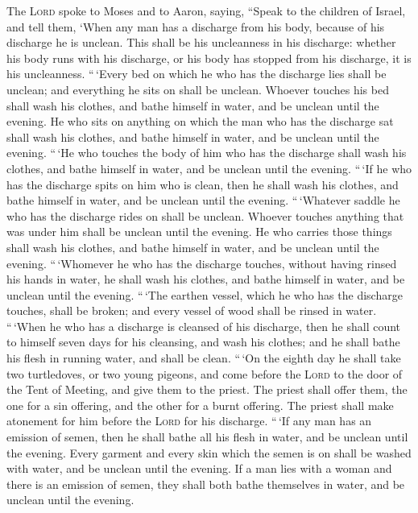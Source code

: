  The \textsc{Lord} spoke to Moses and to Aaron, saying,
 ``Speak to the children of Israel, and tell them, `When
any man has a discharge from his body, because of his discharge he is
unclean.  This shall be his uncleanness in his discharge:
whether his body runs with his discharge, or his body has stopped from
his discharge, it is his uncleanness.  ``\,`Every bed on
which he who has the discharge lies shall be unclean; and everything he
sits on shall be unclean.  Whoever touches his bed shall
wash his clothes, and bathe himself in water, and be unclean until the
evening.  He who sits on anything on which the man who has
the discharge sat shall wash his clothes, and bathe himself in water,
and be unclean until the evening.  ``\,`He who touches the
body of him who has the discharge shall wash his clothes, and bathe
himself in water, and be unclean until the evening. 
``\,`If he who has the discharge spits on him who is clean, then he
shall wash his clothes, and bathe himself in water, and be unclean until
the evening.  ``\,`Whatever saddle he who has the
discharge rides on shall be unclean.  Whoever touches
anything that was under him shall be unclean until the evening. He who
carries those things shall wash his clothes, and bathe himself in water,
and be unclean until the evening.  ``\,`Whomever he who
has the discharge touches, without having rinsed his hands in water, he
shall wash his clothes, and bathe himself in water, and be unclean until
the evening.  ``\,`The earthen vessel, which he who has
the discharge touches, shall be broken; and every vessel of wood shall
be rinsed in water.  ``\,`When he who has a discharge is
cleansed of his discharge, then he shall count to himself seven days for
his cleansing, and wash his clothes; and he shall bathe his flesh in
running water, and shall be clean.  ``\,`On the eighth
day he shall take two turtledoves, or two young pigeons, and come before
the \textsc{Lord} to the door of the Tent of Meeting, and give them to
the priest.  The priest shall offer them, the one for a
sin offering, and the other for a burnt offering. The priest shall make
atonement for him before the \textsc{Lord} for his discharge.
 ``\,`If any man has an emission of semen, then he shall
bathe all his flesh in water, and be unclean until the evening.
 Every garment and every skin which the semen is on shall
be washed with water, and be unclean until the evening. 
If a man lies with a woman and there is an emission of semen, they shall
both bathe themselves in water, and be unclean until the evening.

